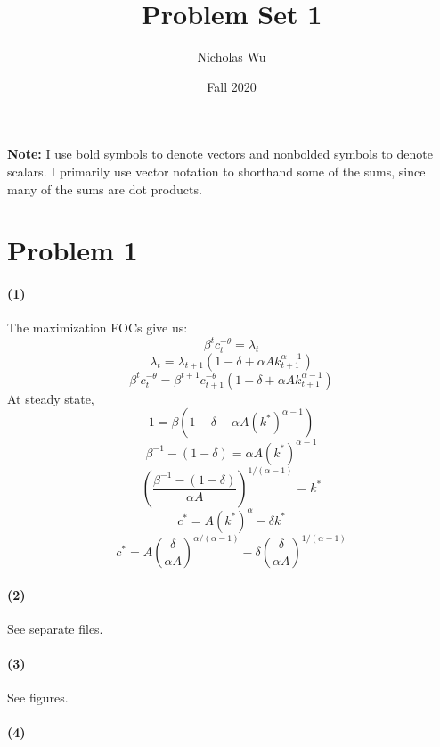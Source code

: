 \documentclass[10pt,letter]{article}
\newcommand{\problem}[1]{\section*{Problem #1}}
\newcommand{\problempart}[1]{\paragraph{#1}}
\begin{document}


\title{Problem Set 1}

\author{Nicholas Wu}

\date{Fall 2020}

\maketitle
\textbf{Note:} I use bold symbols to denote vectors and nonbolded symbols to denote scalars. I primarily use vector notation to shorthand some of the sums, since many of the sums are dot products.

\problem{1}

\problempart{(1)}
The maximization FOCs give us:
 \[ \beta^t c_t^{-\theta} = \lambda_t  \]
 \[ \lambda_t = \lambda_{t+1}(1-\delta + \alpha A k_{t+1}^{\alpha-1})\]
 \[ \beta^t c_t^{-\theta} = \beta^{t+1} c^{-\theta}_{t+1}(1-\delta + \alpha A k_{t+1}^{\alpha-1})\]
 At steady state,
 \[1 = \beta(1-\delta + \alpha A (k^*)^{\alpha-1}) \]
 \[ \beta^{-1} - (1-\delta) = \alpha A (k^*)^{\alpha-1} \]
 \[ \left(\frac{\beta^{-1} - (1-\delta)}{\alpha A}\right)^{1/(\alpha-1)} = k^*\]
 \[ c^* = A(k^*)^\alpha - \delta k^* \]
 \[ c^* = A\left(\frac{\delta}{\alpha A}\right)^{\alpha/(\alpha-1)} - \delta \left(\frac{\delta}{\alpha A}\right)^{1/(\alpha-1)} \]
\problempart{(2)}
See separate files.
\problempart{(3)}
See figures.
\problempart{(4)}


\pagebreak
\end{document}
